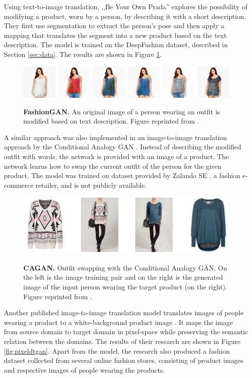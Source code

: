 \documentclass[12pt]{report}
\begin{document}
Using text-to-image translation, ,,Be Your Own Prada'' \cite{zhu_be_2017} explores the possibility of modifying a product, worn by a person, by describing it with a short description. They first use segmentation to extract the person's pose and then apply a mapping that translates the segment into a new product based on the text description. The model is trained on the DeepFashion dataset, described in Section \ref{sec:data}. The results are shown in Figure \ref{fig:fashiongan}.

\begin{figure}[h]
\centering
{\includegraphics[width=\linewidth]{03_analysis/related/fashiongan}}
\caption{\label{fig:fashiongan} \textbf{FashionGAN.} An original image of a person wearing an outfit is modified based on text description. Figure reprinted from \cite{zhu_be_2017}.}
\end{figure}

A similar approach was also implemented in an image-to-image translation approach by the Conditional Analogy GAN \cite{jetchev_conditional_2017}. Instead of describing the modified outfit with words, the network is provided with an image of a product. The network learns how to swap the current outfit of the person for the given product. The model was trained on dataset provided by Zalando SE \cite{zalando_damenmode_nodate}, a fashion e-commerce retailer, and is not publicly available.

\begin{figure}[h]
\centering
{\includegraphics[width=.8\linewidth]{03_analysis/related/cagan}}
\caption{\label{fig:swapgan} \textbf{CAGAN.} Outfit swapping with the Conditional Analogy GAN. On the left is the image training pair and on the right is the generated  image of the input person wearing the target product (on the right). Figure reprinted from \cite{jetchev_conditional_2017}.}
\end{figure}

\pagebreak
Another published image-to-image translation model translates images of people wearing a product to a white-background product image \cite{yoo_pixel-level_2016}. It maps the image from source domain to target domain in pixel-space while preserving the semantic relation between the domains. The results of their research are shown in Figure \ref{fig:pixeldtgan}. Apart from the model, the research also produced a fashion dataset collected from several online fashion stores, consisting of product images and respective images of people wearing the products.
\end{document}
